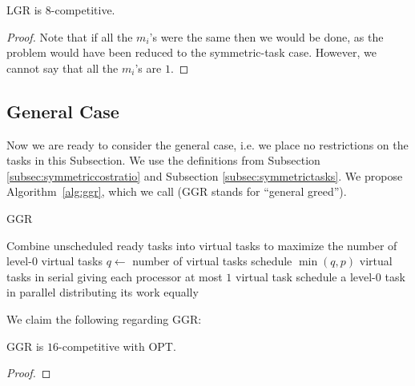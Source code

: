 \begin{proposition}
  LGR is $8$-competitive.
\end{proposition}
\begin{proof}
  Note that if all the $m_i$'s were the same then we would be
  done, as the problem would have been reduced to the
  symmetric-task case. However, we cannot say that all the
  $m_i$'s are $1$.
\end{proof}

\subsection{General Case}
Now we are ready to consider the general case, i.e. we place no
restrictions on the tasks in this Subsection.
We use the definitions from Subsection
\ref{subsec:symmetriccostratio} and Subsection
\ref{subsec:symmetrictasks}.
We propose Algorithm~\ref{alg:ggr}, which we call
 (GGR stands for \enquote{general greed}).

\begin{algorithm}
  \caption{GGR}
  \label{alg:ggr}
  \begin{algorithmic}
        \State Combine unscheduled ready tasks into virtual tasks
        to maximize the number of level-$0$ virtual tasks
        \State $q \gets $ number of virtual tasks 
          \State schedule $\min(q, p)$ virtual tasks in serial
          \State giving each processor at most $1$ virtual task
        \Else
          \State schedule a level-$0$ task in parallel
          \State distributing its work equally 
        \EndIf
      \EndIf
    \EndWhile
  \end{algorithmic}
\end{algorithm}

We claim the following regarding GGR:
\begin{proposition}
  GGR is $16$-competitive with OPT.
\end{proposition}
\begin{proof}
\end{proof}

